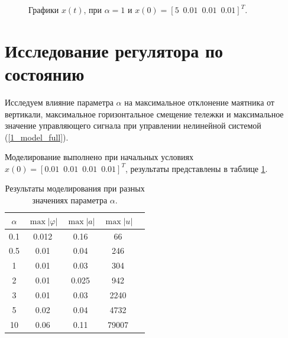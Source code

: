 \begin{figure}[!h]
\caption{Графики $x(t)$, при $\alpha = 1$ и $x(0) = [5\, \, \,  0.01\, \, \, 0.01\, \, \, 0.01]^T$.}
\label{4_1_5}
\end{figure}

\section{Исследование регулятора по состоянию}

Исследуем влияние параметра $\alpha$ на максимальное отклонение маятника от вертикали, максимальное горизонтальное смещение тележки и максимальное значение управляющего сигнала при управлении нелинейной системой (\ref{1_model_full}).

 Моделирование выполнено при начальных условиях $x(0) = [0.01\, \, \,  0.01\, \, \, 0.01\, \, \, 0.01]^T$, результаты представлены в таблице \ref{4_tab_2}.


\begin{table}[h]
\centering
\caption{Результаты моделирования при разных значениях параметра $\alpha$.}
\label{4_tab_2}
\begin{tabular}{ccccc}
\toprule
$\alpha$ & $\max |\varphi|$ & $\max |a|$ & $\max |u|$ \\
\midrule
0.1  &  0.012  &  0.16  &  66  \\
0.5  &  0.01  &  0.04  &  246  \\
1 &  0.01  &  0.03  &  304  \\
2  &  0.01  &  0.025 &  942  \\
3  &  0.01  &  0.03 &  2240  \\
5  &  0.02  &  0.04 &  4732  \\
10  &  0.06  &  0.11 &  79007  \\
\bottomrule
\end{tabular}
\end{table}

